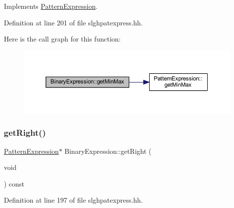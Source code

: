 Implements \mbox{\hyperlink{class_pattern_expression_a4ceb88e89308ac58bf1af4174228f3a0}{Pattern\+Expression}}.



Definition at line 201 of file slghpatexpress.\+hh.

Here is the call graph for this function\+:
\nopagebreak
\begin{figure}[H]
\begin{center}
\leavevmode
\includegraphics[width=350pt]{class_binary_expression_afbce1a4f9e87f25ed8d52792b4d40425_cgraph}
\end{center}
\end{figure}
\mbox{\label{class_binary_expression_a1f9e5f958b015a2959ad0adea1f11efd}} 
\subsubsection{\texorpdfstring{getRight()}{getRight()}}
{\footnotesize\ttfamily \mbox{\hyperlink{class_pattern_expression}{Pattern\+Expression}}$\ast$ Binary\+Expression\+::get\+Right (\begin{DoxyParamCaption}\item[{void}]{ }\end{DoxyParamCaption}) const\hspace{0.3cm}{\ttfamily [inline]}}



Definition at line 197 of file slghpatexpress.\+hh.

